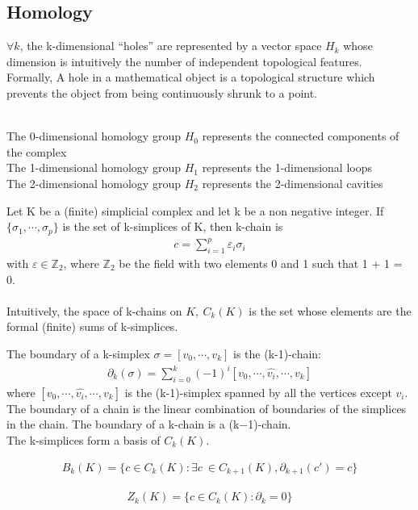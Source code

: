 \subsection{Homology}
\begin{definition}
$\forall k$, the k-dimensional “holes” are represented by a vector space $H_k$ whose dimension is intuitively the number of independent topological features.\\
Formally, A hole in a mathematical object is a topological structure which prevents the object from being continuously shrunk to a point.
\end{definition}
\begin{example}
\ \\
The 0-dimensional homology group $H_0$ represents the connected components of the complex\\
The 1-dimensional homology group $H_1$ represents the 1-dimensional loops\\
The 2-dimensional homology group $H_2$ represents the 2-dimensional cavities
\end{example}
\begin{definition}
Let K be a (finite) simplicial complex and let k be a non negative integer. If $\{\sigma_1,\cdots,\sigma_p\}$ is the set of k-simplices of K, then k-chain is
\begin{align*}
    c = \sum_{i=1}^p \varepsilon_i\sigma_i
\end{align*}
with $\varepsilon \in \mathbb{Z}_2$, where $\mathbb{Z}_2$ be the field with two elements 0 and 1 such that 1 + 1 = 0.\\
\\
Intuitively, the space of k-chains on $K,\ C_k(K)$ is the set whose elements are the formal (finite) sums of k-simplices.
\end{definition}
The boundary of a k-simplex $\sigma =[v_0,\cdots,v_k]$ is the (k-1)-chain:
\begin{align*}
    \partial_k(\sigma) = \sum_{i=0}^k(-1)^i[v_0,\cdots,\hat{v_i},\cdots,v_k]
\end{align*}
where $[v_0,\cdots,\hat{v_i},\cdots,v_k]$ is the (k-1)-simplex spanned by all the vertices except $v_i$.
\\
The boundary of a chain is the linear combination of boundaries of the simplices in the chain. The boundary of a k-chain is a (k−1)-chain.\\

The k-simplices form a basis of $C_k(K)$.
\begin{definition} 
\begin{align*}
    B_k(K) = \{c \in C_k(K) : \exists c\ \in C_{k+1}(K), \partial_{k+1}(c') = c\}
\end{align*}
\end{definition}
\begin{definition} 
\begin{align*}
    Z_k(K) = \{c \in C_k(K) : \partial_{k}=0\}
\end{align*}
\end{definition}


